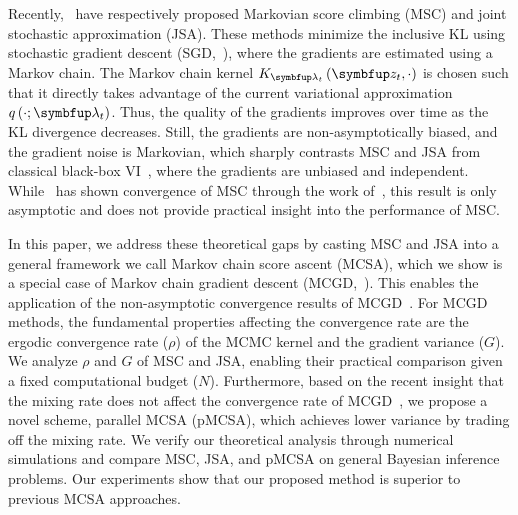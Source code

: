 Recently,~\citet{NEURIPS2020_b2070693,pmlr-v124-ou20a} have respectively proposed Markovian score climbing (MSC) and joint stochastic approximation (JSA).
These methods minimize the inclusive KL using stochastic gradient descent (SGD,~\citealt{robbins_stochastic_1951}), where the gradients are estimated using a Markov chain.
The Markov chain kernel \(K_{\vlambda_t}\left(\vz_t, \cdot\right)\) is chosen such that it directly takes advantage of the current variational approximation \(q\left(\cdot; \vlambda_t\right)\).
Thus, the quality of the gradients improves over time as the KL divergence decreases.
Still, the gradients are non-asymptotically biased, and the gradient noise is Markovian, which sharply contrasts MSC and JSA from classical black-box VI~\citep{pmlr-v33-ranganath14, JMLR:v18:16-107}, where the gradients are unbiased and independent.
While~\citet{NEURIPS2020_b2070693} has shown convergence of MSC through the work of~\citet{gu_stochastic_1998}, this result is only asymptotic and does not provide practical insight into the performance of MSC.

%

In this paper, we address these theoretical gaps by casting MSC and JSA into a general framework we call Markov chain score ascent (MCSA), which we show is a special case of Markov chain gradient descent (MCGD,~\citealt{duchi_ergodic_2012}).
This enables the application of the non-asymptotic convergence results of MCGD~\citep{duchi_ergodic_2012, NEURIPS2018_1371bcce, pmlr-v99-karimi19a, doan_finitetime_2020, doan_convergence_2020, Xiong_Xu_Liang_Zhang_2021, debavelaere_convergence_2021}.
For MCGD methods, the fundamental properties affecting the convergence rate are the ergodic convergence rate (\(\rho\)) of the MCMC kernel and the gradient variance (\(G\)).
We analyze \(\rho\) and \(G\) of MSC and JSA, enabling their practical comparison given a fixed computational budget (\(N\)).
Furthermore, based on the recent insight that the mixing rate does not affect the convergence rate of MCGD~\citet{doan_convergence_2020,doan_finitetime_2020}, we propose a novel scheme, parallel MCSA (pMCSA), which achieves lower variance by trading off the mixing rate.
We verify our theoretical analysis through numerical simulations and compare MSC, JSA, and pMCSA on general Bayesian inference problems.
Our experiments show that our proposed method is superior to previous MCSA approaches.

